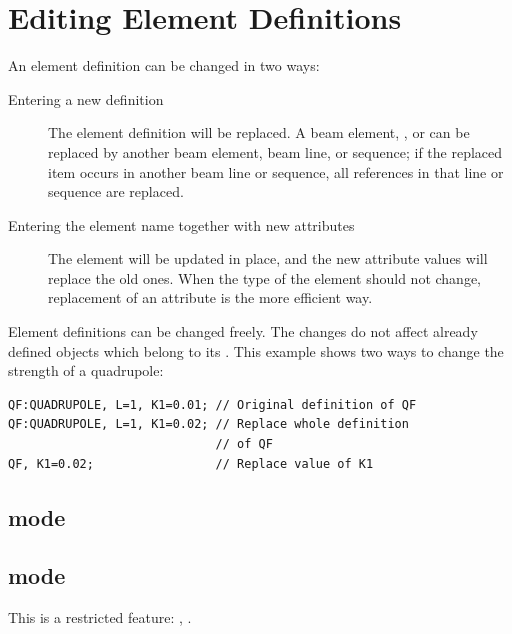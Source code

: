 \section{Editing Element Definitions}
\label{sec:elm-edit}
An element definition can be changed in two ways:
\begin{description}
\item[Entering a new definition]
  The element definition will be replaced.
  A beam element, , 
  or 
  can be replaced by another beam element, beam line, or sequence;
  if the replaced item occurs in another beam line or sequence,
  all references in that line or sequence are replaced.
\item[Entering the element name together with new attributes]
  The element will be updated in place,
  and the new attribute values will replace the old ones.
  When the type of the element should not change,
  replacement of an attribute is the more efficient way.
\end{description}
Element definitions can be changed freely.
The changes do not affect already defined objects which belong to
its .
This example shows two ways to change the strength of a quadrupole:
\begin{verbatim}
QF:QUADRUPOLE, L=1, K1=0.01; // Original definition of QF
QF:QUADRUPOLE, L=1, K1=0.02; // Replace whole definition 
                             // of QF
QF, K1=0.02;                 // Replace value of K1
\end{verbatim}
\subsection{\opalt mode}

\subsection{\opalcycl mode}

This is a restricted feature: \noopalt, \noopalcycl .

